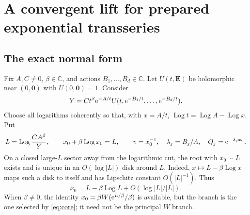 \documentclass[11pt,a4paper]{article}
\numberwithin{equation}{section}
\theoremstyle{definition}\newtheorem{definition}[theorem]{Definition}
\theoremstyle{remark}\newtheorem{remark}[theorem]{Remark}
\newcommand{\C}{\mathbb C}\newcommand{\Q}{\mathbb Q}\newcommand{\Z}{\mathbb Z}
\newcommand{\Log}{\operatorname{Log}}\newcommand{\Li}{\operatorname{Li}}
\newcommand{\vct}[1]{\boldsymbol{#1}}
\begin{document}
\section{A convergent lift for prepared exponential transseries}
\label{sec:prepared}

\subsection{The exact normal form}
Fix $A,C\ne0$, $\beta\in\C$, and actions $B_1,\ldots,B_d\in\C$.
Let $U(t,\vct E)$ be holomorphic near $(0,\vct0)$ with $U(0,\vct0)=1$.
Consider
\begin{equation}\label{eq:prepared-map}
 Y=Ct^\beta\mathrm e^{-A/t}
 U(t,\mathrm e^{-B_1/t},\ldots,\mathrm e^{-B_d/t}).
\end{equation}
Choose all logarithms coherently so that, with $x=A/t$,
$\Log t=\Log A-\Log x$. Put
\begin{equation}\label{eq:core}
 L=\Log\frac{CA^\beta}{Y},\qquad
 x_0+\beta\Log x_0=L,\qquad
 v=x_0^{-1},\quad \lambda_j=B_j/A,\quad Q_j=\e^{-\lambda_jx_0}.
\end{equation}
On a closed large-$L$ sector away from the logarithmic cut, the root with
$x_0\sim L$ exists and is unique in an $O(\log|L|)$ disk around $L$.
Indeed, $x\mapsto L-\beta\Log x$ maps such a disk to itself and has
Lipschitz constant $O(|L|^{-1})$. Thus
\begin{equation}\label{eq:x0-expansion}
 x_0=L-\beta\Log L+O(\log|L|/|L|).
\end{equation}
When $\beta\ne0$, the identity
$x_0=\beta W(\mathrm e^{L/\beta}/\beta)$ is available, but the branch is the one
selected by \eqref{eq:core}; it need not be the principal $W$ branch.
\end{document}

